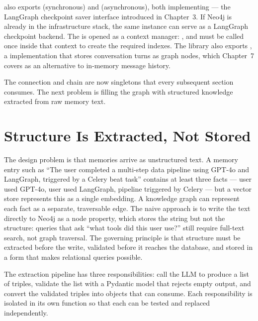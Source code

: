 \begin{notebox}
 also exports  (synchronous) and
 (asynchronous), both implementing
 --- the LangGraph checkpoint saver interface
introduced in Chapter~3. If Neo4j is already in the infrastructure stack,
the same instance can serve as a LangGraph checkpoint backend. The
 is opened as a context manager:
,
and  must be called once inside that context to create
the required indexes. The library also exports
, a 
implementation that stores conversation turns as graph nodes, which
Chapter~7 covers as an alternative to in-memory message history.
\end{notebox}

The connection and chain are now singletons that every subsequent section
consumes. The next problem is filling the graph with structured knowledge
extracted from raw memory text.


\section{Structure Is Extracted, Not Stored}
\label{sec:kg-extraction}

The design problem is that memories arrive as unstructured text. A memory
entry such as ``The user completed a multi-step data pipeline using GPT-4o
and LangGraph, triggered by a Celery beat task'' contains at least three
facts --- user used GPT-4o, user used LangGraph, pipeline triggered by
Celery --- but a vector store represents this as a single embedding. A
knowledge graph can represent each fact as a separate, traversable edge.
The naive approach is to write the text directly to Neo4j as a node
property, which stores the string but not the structure: queries that ask
``what tools did this user use?'' still require full-text search, not graph
traversal. The governing principle is that structure must be extracted
before the write, validated before it reaches the database, and stored in
a form that makes relational queries possible.

The extraction pipeline has three responsibilities: call the LLM to
produce a list of  triples, validate
the list with a Pydantic model that rejects empty output, and convert the
validated triples into  objects that
 can consume. Each responsibility is
isolated in its own function so that each can be tested and replaced
independently.

